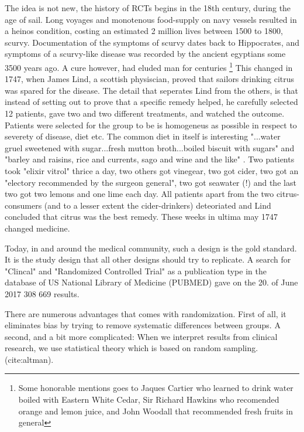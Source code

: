 \documentclass[12p]{article}
\begin{document}
The idea is not new, the history of RCTs begins in the 18th century, during the age of sail.
Long voyages and monotenous food-supply on navy vessels resulted in a heinos condition, costing an estimated 2 million lives between 1500 to 1800, scurvy.
Documentation of the symptoms of scurvy dates back to Hippocrates, and symptoms of a scurvy-like disease was recorded by the ancient egyptians some 3500 years ago.
A cure however, had eluded man for centuries \footnote{Some honorable mentions goes to Jaques Cartier who learned to drink water boiled with Eastern White Cedar, Sir Richard Hawkins who recomended orange and lemon juice, and John Woodall that recommended fresh fruits in general}
This changed in 1747, when James Lind, a scottish physiscian, proved that sailors drinking citrus was spared for the disease.
The detail that seperates Lind from the others, is that instead of setting out to prove that a specific remedy helped, he carefully selected 12 patients, gave two and two different treatments, and watched the outcome.
Patients were selected for the group to be is homogeneus as possible in respect to severety of disease, diet etc.
The common diet in itself is interesting "...water gruel sweetened with sugar...fresh mutton broth...boiled biscuit with sugars" and "barley and raisins, rice and currents, sago and wine and the like" \cite{RN3}.
Two patients took "elixir vitrol" thrice a day, two others got vinegear, two got cider, two got an "electory recommended by the surgeon general", two got seawater (!) and the last two got two lemons and one lime each day.
All patients apart from the two citrus-consumers (and to a lesser extent the cider-drinkers) deteoriated and Lind concluded that citrus was the best remedy.
These weeks in ultima may 1747 changed medicine.

Today, in and around the medical community, such a design is the gold standard.
It is the study design that all other designs should try to replicate. 
A search for "Clincal" and "Randomized Controlled Trial" as a publication type in the database of US National Library of Medicine (PUBMED) gave on the 20. of June 2017 308 669 results.

There are numerous advantages that comes with randomization.
First of all, it eliminates bias by trying to remove systematic differences between groups.
A second, and a bit more complicated: 
When we interpret results from clinical research, we use statistical theory which is based on random sampling. (cite:altman).
\end{document}

